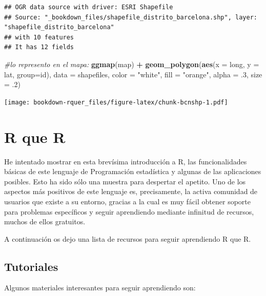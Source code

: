 \documentclass[]{book}
\newenvironment{Shaded}{\begin{snugshade}}{\end{snugshade}}
\newcommand{\CommentTok}[1]{\textcolor[rgb]{0.56,0.35,0.01}{\textit{#1}}}
\newcommand{\DataTypeTok}[1]{\textcolor[rgb]{0.13,0.29,0.53}{#1}}
\newcommand{\FloatTok}[1]{\textcolor[rgb]{0.00,0.00,0.81}{#1}}
\newcommand{\KeywordTok}[1]{\textcolor[rgb]{0.13,0.29,0.53}{\textbf{#1}}}
\newcommand{\NormalTok}[1]{#1}
\newcommand{\OperatorTok}[1]{\textcolor[rgb]{0.81,0.36,0.00}{\textbf{#1}}}
\newcommand{\StringTok}[1]{\textcolor[rgb]{0.31,0.60,0.02}{#1}}
\theoremstyle{definition}
\theoremstyle{definition}
\theoremstyle{definition}
\theoremstyle{remark}
\begin{document}
\begin{verbatim}
## OGR data source with driver: ESRI Shapefile 
## Source: "_bookdown_files/shapefile_distrito_barcelona.shp", layer: "shapefile_distrito_barcelona"
## with 10 features
## It has 12 fields
\end{verbatim}

\begin{Shaded}
\begin{Highlighting}[]
\CommentTok{#lo represento en el mapa:}
\KeywordTok{ggmap}\NormalTok{(map) }\OperatorTok{+}\StringTok{ }\KeywordTok{geom_polygon}\NormalTok{(}\KeywordTok{aes}\NormalTok{(}\DataTypeTok{x =}\NormalTok{ long, }\DataTypeTok{y =}\NormalTok{ lat, }\DataTypeTok{group=}\NormalTok{id), }
\DataTypeTok{data =}\NormalTok{ shapefiles, }\DataTypeTok{color =} \StringTok{"white"}\NormalTok{, }\DataTypeTok{fill =} \StringTok{"orange"}\NormalTok{, }
\DataTypeTok{alpha =} \FloatTok{.3}\NormalTok{, }\DataTypeTok{size =} \FloatTok{.2}\NormalTok{)}
\end{Highlighting}
\end{Shaded}

\texttt{[image: bookdown-rquer\_files/figure-latex/chunk-bcnshp-1.pdf]}

\hypertarget{r-que-r}{%
\chapter{R que R}\label{r-que-r}}

He intentado mostrar en esta brevísima introducción a R, las
funcionalidades básicas de este lenguaje de Programación estadística y
algunas de las aplicaciones posibles. Esto ha sido sólo una muestra para
despertar el apetito. Uno de los aspectos más positivos de este lenguaje
es, precisamente, la activa comunidad de usuarios que existe a su
entorno, gracias a la cual es muy fácil obtener soporte para problemas
específicos y seguir aprendiendo mediante infinitud de recursos, muchos
de ellos gratuitos.

A continuación os dejo una lista de recursos para seguir aprendiendo R
que R.

\hypertarget{tutoriales}{%
\section{Tutoriales}\label{tutoriales}}

Algunos materiales interesantes para seguir aprendiendo son:
\end{document}

